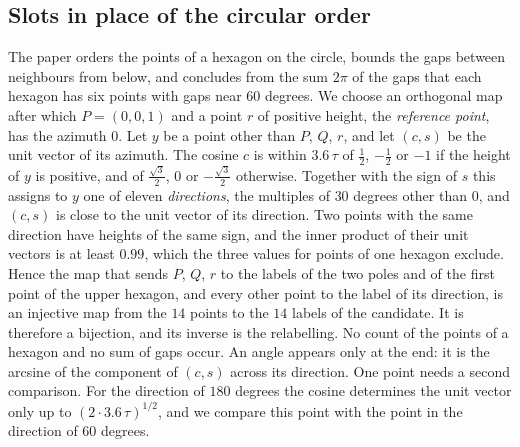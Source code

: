 \documentclass[reqno,a4paper,11pt]{amsart}
\begin{document}
\subsection*{Slots in place of the circular order}
The paper orders the points of a hexagon on the circle, bounds the gaps between neighbours from below, and concludes from the sum $2\pi$ of the gaps that each hexagon has six points with gaps near $60$ degrees. We choose an orthogonal map after which $P = (0,0,1)$ and a point $r$ of positive height, the \emph{reference point}, has the azimuth $0$. Let $y$ be a point other than $P$, $Q$, $r$, and let $(c, s)$ be the unit vector of its azimuth. The cosine $c$ is within $3.6 \, \tau$ of $\frac12$, $-\frac12$ or $-1$ if the height of $y$ is positive, and of $\frac{\sqrt 3}{2}$, $0$ or $-\frac{\sqrt 3}{2}$ otherwise. Together with the sign of $s$ this assigns to $y$ one of eleven \emph{directions}, the multiples of $30$ degrees other than $0$, and $(c,s)$ is close to the unit vector of its direction. Two points with the same direction have heights of the same sign, and the inner product of their unit vectors is at least $0.99$, which the three values for points of one hexagon exclude. Hence the map that sends $P$, $Q$, $r$ to the labels of the two poles and of the first point of the upper hexagon, and every other point to the label of its direction, is an injective map from the $14$ points to the $14$ labels of the candidate. It is therefore a bijection, and its inverse is the relabelling. No count of the points of a hexagon and no sum of gaps occur. An angle appears only at the end: it is the arcsine of the component of $(c,s)$ across its direction. One point needs a second comparison. For the direction of $180$ degrees the cosine determines the unit vector only up to $(2 \cdot 3.6 \, \tau)^{1/2}$, and we compare this point with the point in the direction of $60$ degrees.
\end{document}

